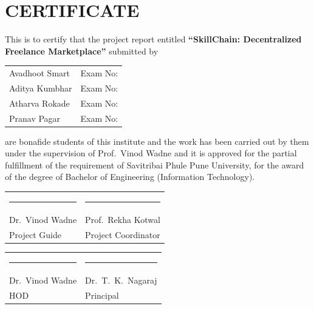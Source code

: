 
\chapter*{CERTIFICATE}

\noindent This is to certify that the project report entitled \textbf{``SkillChain: Decentralized Freelance Marketplace''} submitted by

\vspace{0.6em}

\begin{center}
\begin{tabular}{p{5cm}p{4cm}}
Avadhoot Smart  & Exam No: \\[0.3em]
Aditya Kumbhar  & Exam No: \\[0.3em]
Atharva Rokade  & Exam No: \\[0.3em]
Pranav Pagar    & Exam No: \\
\end{tabular}
\end{center}

\vspace{0.6em}

\noindent are bonafide students of this institute and the work has been carried out by them under the supervision of Prof.\ Vinod Wadne and it is approved for the partial fulfillment of the requirement of Savitribai Phule Pune University, for the award of the degree of Bachelor of Engineering (Information Technology).

\vspace{1.5em}

\begin{center}
\begin{tabular}{p{5cm}p{5cm}}
\centering \rule{4cm}{0.4pt}        & \centering \rule{4cm}{0.4pt}        \tabularnewline
\centering Dr.\ Vinod Wadne         & \centering Prof.\ Rekha Kotwal       \tabularnewline
\centering Project Guide           & \centering Project Coordinator       \tabularnewline
\end{tabular}
\end{center}

\vspace{1.2em}

\begin{center}
\begin{tabular}{p{5cm}p{5cm}}
\centering \rule{4cm}{0.4pt}        & \centering \rule{4cm}{0.4pt}        \tabularnewline
\centering Dr.\ Vinod Wadne         & \centering Dr.\ T.\ K.\ Nagaraj      \tabularnewline
\centering HOD                     & \centering Principal                  \tabularnewline
\end{tabular}
\end{center}

